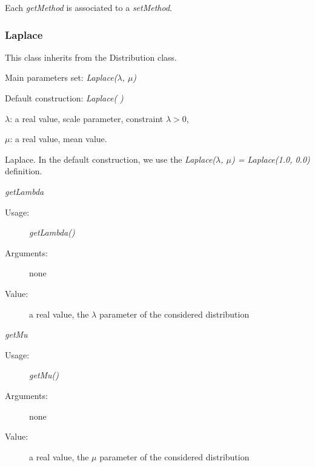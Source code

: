 Each  \textit{getMethod}  is associated to a \textit{setMethod}.

\newpage
\subsubsection{Laplace}

This class inherits from the Distribution class.

\begin{description}

\item[Usage:]  \rule{0pt}{1em}
\begin{description}
\item Main parameters set: \textit{Laplace($\lambda$, $\mu$)}
\item Default construction: \textit{Laplace( )}
\end{description}

\item[Arguments:]  \rule{0pt}{1em}
\begin{description}
\item $\lambda$:  a real value, scale parameter, constraint $\lambda>0$,
\item $\mu$: a real value, mean value.
\end{description}

\item[Value:] Laplace. In the default construction, we use the \textit{Laplace($\lambda$, $\mu$) = Laplace(1.0, 0.0)} definition.

\item[Some methods:] \rule{0pt}{1em}
\begin{description}

\item \textit{getLambda}
\begin{description}
\item[Usage:] \textit{getLambda()}
\item[Arguments:] none
\item[Value:]  a real value, the  $\lambda$ parameter of the considered distribution
\end{description}
\bigskip

\item \textit{getMu}
\begin{description}
\item[Usage:] \textit{getMu()}
\item[Arguments:] none
\item[Value:]  a real value, the  $\mu$ parameter of the considered distribution
\end{description}
\bigskip
\end{description}


\end{description}
